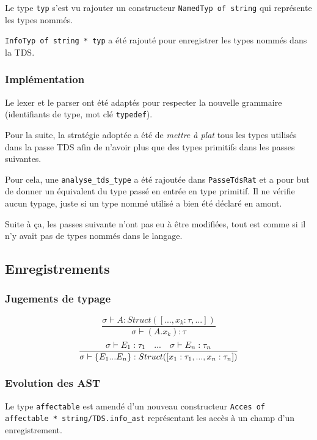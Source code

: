 \documentclass[headings=standardclasses,parskip=half]{scrartcl}
\begin{document}
Le type \texttt{typ} s'est vu rajouter un constructeur
\texttt{NamedTyp of string} qui représente les types nommés.

\texttt{InfoTyp of string * typ} a été rajouté pour enregistrer
les types nommés dans la TDS.

\subsubsection*{Implémentation}

Le lexer et le parser ont été adaptés pour respecter la nouvelle
grammaire (identifiants de type, mot clé \texttt{typedef}).

Pour la suite, la stratégie adoptée a été de \textit{mettre à plat}
tous les types utilisés dans la passe TDS afin de n'avoir plus que
des types primitifs dans les passes suivantes.

Pour cela, une \texttt{analyse\_tds\_type} a été rajoutée dans
\texttt{PasseTdsRat} et a pour but de donner un équivalent du type
passé en entrée en type primitif.
Il ne vérifie aucun typage, juste si un type nommé utilisé a bien été
déclaré en amont.

Suite à ça, les passes suivante n'ont pas eu à être modifiées, tout
est comme si il n'y avait pas de types nommés dans le langage.

\subsection{Enregistrements}

\subsubsection*{Jugements de typage}

\[\frac{\sigma \vdash A : Struct([...,x_k : \tau,...])}
    {\sigma \vdash (A.x_k) : \tau}\]
\[\frac{\sigma \vdash E_1:\tau_1 \quad ... \quad\sigma \vdash E_n:\tau_n}
    {\sigma \vdash \{E_1 \space ...\space E_n \} :
        Struct([x_1: \tau_1,\space...,\space x_n:\tau_n])}\]

\subsubsection*{Evolution des AST}

Le type \texttt{affectable} est amendé d'un nouveau constructeur
\texttt{Acces of affectable * string/TDS.info\_ast} représentant les
accès à un champ d'un enregistrement.
\end{document}
